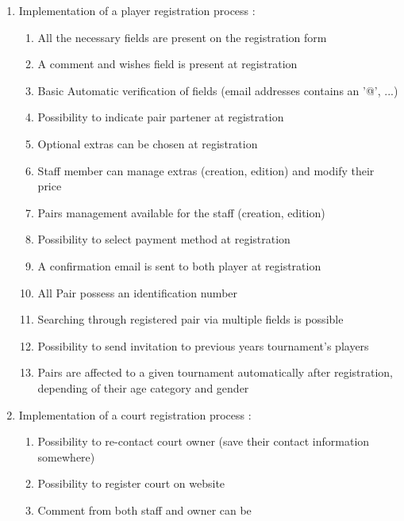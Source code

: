 \begin{enumerate} \itemsep1pt
\item Implementation of a player registration process :
\begin{enumerate} \itemsep1pt
\item \textcolor{green!60!black} {All the necessary fields are present on 
the registration form}
\item \textcolor{green!60!black} {A comment and wishes field is present at registration}
\item \textcolor{green!60!black} {Basic Automatic verification of fields 
(email addresses contains an '@', ...)}
\item \textcolor{green!60!black} {Possibility to indicate pair partener 
at registration}
\item \textcolor{green!60!black} {Optional extras can be chosen at 
registration}
\item \textcolor{green!60!black} {Staff member can manage extras 
(creation, edition) and modify their price}
\item \textcolor{green!60!black} {Pairs management available for the 
staff (creation, edition)}
\item \textcolor{green!60!black} {Possibility to select payment method
 at registration}
\item \textcolor{green!60!black} {A confirmation email is sent to both
 player at registration}
\item \textcolor{green!60!black} {All Pair possess an identification
 number}
\item \textcolor{green!60!black} {Searching through registered pair via
 multiple fields is possible}
\item \textcolor{green!60!black} {Possibility to send invitation to previous
 years tournament's players}
\item \textcolor{green!60!black} {Pairs are affected to a given tournament 
automatically after registration, depending of their age category and gender}
\end{enumerate}
\item Implementation of a court registration process :
\begin{enumerate} \itemsep1pt
\item \textcolor{green!60!black} {Possibility to re-contact court owner (save 
their contact information somewhere)}
\item \textcolor{green!60!black} {Possibility to register court on website}
\item \textcolor{green!60!black} {Comment from both staff and owner can be 
}
\end{enumerate}
\end{enumerate}
